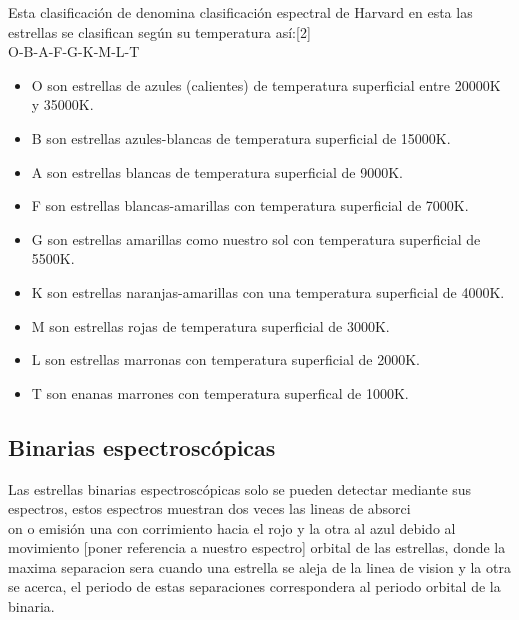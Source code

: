 \documentclass[Proceedings]{ascelike}
\begin{document}
Esta clasificaci\'on de denomina clasificaci\'on espectral de Harvard en esta las estrellas se clasifican seg\'un su temperatura as\'i:[2]\\

O-B-A-F-G-K-M-L-T\\

\begin{itemize}

\item O son estrellas de azules (calientes) de temperatura superficial entre 20000K y 35000K.\\
\item B son estrellas azules-blancas de temperatura superficial de 15000K.\\
\item A son estrellas blancas de temperatura superficial de 9000K.\\
\item F son estrellas blancas-amarillas con temperatura superficial de 7000K.\\
\item G son estrellas amarillas como nuestro sol con temperatura superficial de 5500K.\\
\item K son estrellas naranjas-amarillas con una temperatura superficial de 4000K.\\
\item M son estrellas rojas de temperatura superficial de 3000K.\\
\item L son estrellas marronas con temperatura superficial de 2000K.\\
\item T son enanas marrones con temperatura superfical de 1000K.\\
\end{itemize}


\subsection{Binarias espectrosc\'opicas}

Las estrellas binarias espectrosc\'opicas solo se pueden detectar mediante sus espectros,  
estos espectros muestran dos veces las lineas de absorci\\on o emisi\'on una con corrimiento hacia 
el rojo y la otra al azul debido al movimiento [poner referencia a nuestro espectro]
orbital de las estrellas, donde la maxima separacion sera cuando una estrella se aleja de la
linea de vision y la otra se acerca, el periodo de estas separaciones correspondera al periodo
orbital de la binaria.
\end{document}
